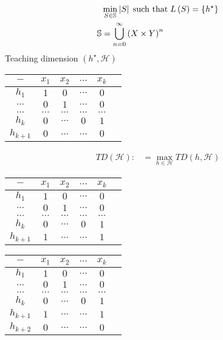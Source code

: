 \documentclass{article}
\begin{document}
\begin{align*}
&  \displaystyle\min_{S \in \mathbb{S}} \left|  S  \right| \text{\;such that\;} L\left(S\right) = \left\{h^\star \right\}
\\ \mathbb{S} &= \displaystyle\bigcup _{n=0}^{\infty} \left(X \times Y \right)^{n}
\end{align*}
Teaching dimension $\left(h^\star , \mathcal{H}\right)$
\newline \newline
\begin{center} \begin{tabular}{|c|c|c|c|c|c|}
\hline
 $-$ &$x_{1}$ &$x_{2}$ &$...$ &$x_{k}$\\ \hline
$h_{1}$ &$1$ &$0$ &$...$ &$0$\\ \hline
$...$ &$0$ &$1$ &$...$ &$0$\\ \hline
$...$ &$...$ &$...$ &$...$ &$...$\\ \hline
$h_{k}$ &$0$ &$...$ &$0$ &$1$\\ \hline
$h_{k+1}$ &$0$ &$...$ &$...$ &$0$\\ \hline
\end{tabular} \end{center}
\begin{align*}
TD\left(\mathcal{H}\right)  :&= \displaystyle\max_{h \in \mathcal{H}} TD\left(h, \mathcal{H}\right) 
\end{align*}
\begin{center} \begin{tabular}{|c|c|c|c|c|c|}
\hline
 $-$ &$x_{1}$ &$x_{2}$ &$...$ &$x_{k}$\\ \hline
$h_{1}$ &$1$ &$0$ &$...$ &$0$\\ \hline
$...$ &$0$ &$1$ &$...$ &$0$\\ \hline
$...$ &$...$ &$...$ &$...$ &$...$\\ \hline
$h_{k}$ &$0$ &$...$ &$0$ &$1$\\ \hline
$h_{k+1}$ &$1$ &$...$ &$...$ &$1$\\ \hline
\end{tabular} \end{center}
\begin{center} \begin{tabular}{|c|c|c|c|c|c|}
\hline
 $-$ &$x_{1}$ &$x_{2}$ &$...$ &$x_{k}$\\ \hline
$h_{1}$ &$1$ &$0$ &$...$ &$0$\\ \hline
$...$ &$0$ &$1$ &$...$ &$0$\\ \hline
$...$ &$...$ &$...$ &$...$ &$...$\\ \hline
$h_{k}$ &$0$ &$...$ &$0$ &$1$\\ \hline
$h_{k+1}$ &$1$ &$...$ &$...$ &$1$\\ \hline
$h_{k+2}$ &$0$ &$...$ &$...$ &$0$\\ \hline
\end{tabular} \end{center}
\end{document}
